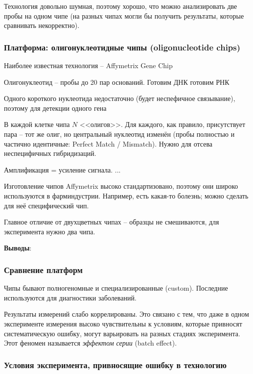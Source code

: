 \documentclass[main.tex]{subfiles}
\begin{document}
Технология довольно шумная, поэтому хорошо, что можно анализировать две пробы на одном чипе (на разных чипах могли бы получить результаты, которые сравнивать некорректно).

\subsubsection{Платформа: олигонуклеотидные чипы (oligonucleotide chips)}

Наиболее известная технология -- Affymetrix Gene Chip

Олигонуклеотид -- пробы до  20 пар оснований. Готовим ДНК \textrightarrow готовим РНК

Одного короткого нуклеотида недостаточно (будет неспефичное связывание), поэтому для детекции одного гена

В каждой клетке чипа $ N $ <<олигов>>. Для каждого, как правило, присутствует пара -- тот же олиг, но центральный нуклеотид изменён (пробы полностью и частично идентичные: Perfect Match / Mismatch). Нужно для отсева неспецифичных гибридизаций.

Амплификация = усиление сигнала. %
...

Изготовление чипов Affymetrix высоко стандартизовано, поэтому они широко используются в фарминдустрии. Например, есть какая-то болезнь; можно сделать для неё специфический чип.

Главное отличие от двухцветных чипах -- образцы не смешиваются, для эксперимента нужно два чипа.

\textbf{Выводы}:

\subsubsection{Сравнение платформ}

Чипы бывают полногеномные и специализированные (custom).
Последние используются для диагностики заболеваний.

Результаты измерений слабо коррелированы.
Это связано с тем, что даже в одном эксперименте измерения высоко чувствительны к условиям, которые привносят систематическую ошибку, могут варьировать на разных стадиях эксперимента. Этот феномен называется \emph{эффектом серии} (batch effect).

\subsubsection{Условия эксперимента, привносящие ошибку в технологию}
\end{document}
